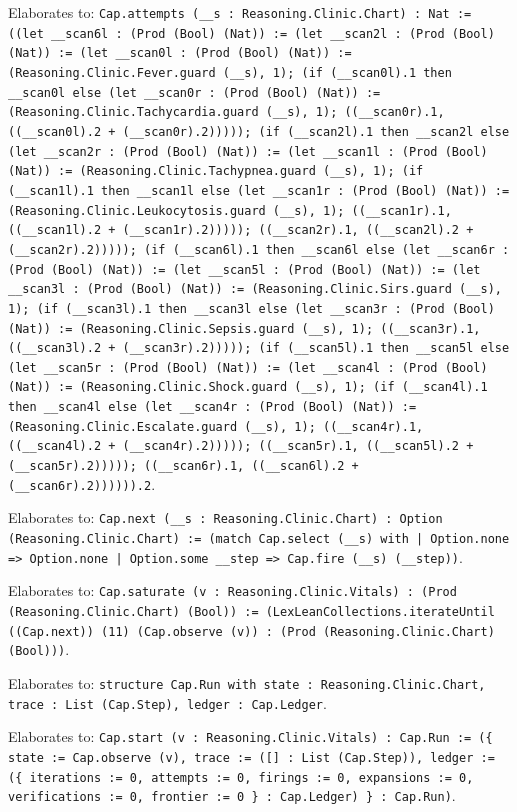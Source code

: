 \documentclass[11pt]{article}
\begin{document}
\noindent Elaborates to: \texttt{Cap.attempts (\_\_s : Reasoning.Clinic.Chart) : Nat := ((let \_\_scan6l : (Prod (Bool) (Nat)) := (let \_\_scan2l : (Prod (Bool) (Nat)) := (let \_\_scan0l : (Prod (Bool) (Nat)) := (Reasoning.Clinic.Fever.guard (\_\_s), 1); (if (\_\_scan0l).1 then \_\_scan0l else (let \_\_scan0r : (Prod (Bool) (Nat)) := (Reasoning.Clinic.Tachycardia.guard (\_\_s), 1); ((\_\_scan0r).1, ((\_\_scan0l).2 + (\_\_scan0r).2))))); (if (\_\_scan2l).1 then \_\_scan2l else (let \_\_scan2r : (Prod (Bool) (Nat)) := (let \_\_scan1l : (Prod (Bool) (Nat)) := (Reasoning.Clinic.Tachypnea.guard (\_\_s), 1); (if (\_\_scan1l).1 then \_\_scan1l else (let \_\_scan1r : (Prod (Bool) (Nat)) := (Reasoning.Clinic.Leukocytosis.guard (\_\_s), 1); ((\_\_scan1r).1, ((\_\_scan1l).2 + (\_\_scan1r).2))))); ((\_\_scan2r).1, ((\_\_scan2l).2 + (\_\_scan2r).2))))); (if (\_\_scan6l).1 then \_\_scan6l else (let \_\_scan6r : (Prod (Bool) (Nat)) := (let \_\_scan5l : (Prod (Bool) (Nat)) := (let \_\_scan3l : (Prod (Bool) (Nat)) := (Reasoning.Clinic.Sirs.guard (\_\_s), 1); (if (\_\_scan3l).1 then \_\_scan3l else (let \_\_scan3r : (Prod (Bool) (Nat)) := (Reasoning.Clinic.Sepsis.guard (\_\_s), 1); ((\_\_scan3r).1, ((\_\_scan3l).2 + (\_\_scan3r).2))))); (if (\_\_scan5l).1 then \_\_scan5l else (let \_\_scan5r : (Prod (Bool) (Nat)) := (let \_\_scan4l : (Prod (Bool) (Nat)) := (Reasoning.Clinic.Shock.guard (\_\_s), 1); (if (\_\_scan4l).1 then \_\_scan4l else (let \_\_scan4r : (Prod (Bool) (Nat)) := (Reasoning.Clinic.Escalate.guard (\_\_s), 1); ((\_\_scan4r).1, ((\_\_scan4l).2 + (\_\_scan4r).2))))); ((\_\_scan5r).1, ((\_\_scan5l).2 + (\_\_scan5r).2))))); ((\_\_scan6r).1, ((\_\_scan6l).2 + (\_\_scan6r).2)))))).2}.\par
\noindent Elaborates to: \texttt{Cap.next (\_\_s : Reasoning.Clinic.Chart) : Option (Reasoning.Clinic.Chart) := (match Cap.select (\_\_s) with | Option.none => Option.none | Option.some \_\_step => Cap.fire (\_\_s) (\_\_step))}.\par
\noindent Elaborates to: \texttt{Cap.saturate (v : Reasoning.Clinic.Vitals) : (Prod (Reasoning.Clinic.Chart) (Bool)) := (LexLeanCollections.iterateUntil ((Cap.next)) (11) (Cap.observe (v)) : (Prod (Reasoning.Clinic.Chart) (Bool)))}.\par
\noindent Elaborates to: \texttt{structure Cap.Run with state : Reasoning.Clinic.Chart, trace : List (Cap.Step), ledger : Cap.Ledger}.\par
\noindent Elaborates to: \texttt{Cap.start (v : Reasoning.Clinic.Vitals) : Cap.Run := (\{ state := Cap.observe (v), trace := ([] : List (Cap.Step)), ledger := (\{ iterations := 0, attempts := 0, firings := 0, expansions := 0, verifications := 0, frontier := 0 \} : Cap.Ledger) \} : Cap.Run)}.\par
\end{document}
